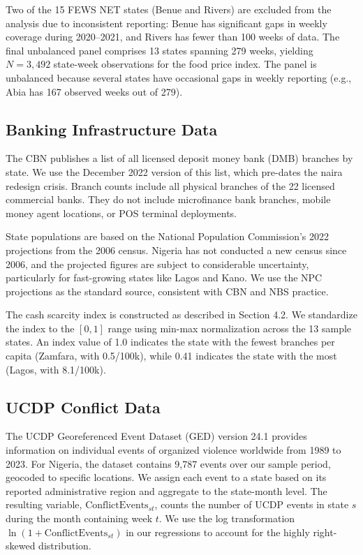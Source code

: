 \documentclass[12pt]{article}
\begin{document}
Two of the 15 FEWS NET states (Benue and Rivers) are excluded from the analysis due to inconsistent reporting: Benue has significant gaps in weekly coverage during 2020--2021, and Rivers has fewer than 100 weeks of data. The final unbalanced panel comprises 13 states spanning 279 weeks, yielding $N = 3{,}492$ state-week observations for the food price index. The panel is unbalanced because several states have occasional gaps in weekly reporting (e.g., Abia has 167 observed weeks out of 279).

\subsection{Banking Infrastructure Data}

The CBN publishes a list of all licensed deposit money bank (DMB) branches by state. We use the December 2022 version of this list, which pre-dates the naira redesign crisis. Branch counts include all physical branches of the 22 licensed commercial banks. They do not include microfinance bank branches, mobile money agent locations, or POS terminal deployments.

State populations are based on the National Population Commission's 2022 projections from the 2006 census. Nigeria has not conducted a new census since 2006, and the projected figures are subject to considerable uncertainty, particularly for fast-growing states like Lagos and Kano. We use the NPC projections as the standard source, consistent with CBN and NBS practice.

The cash scarcity index is constructed as described in Section 4.2. We standardize the index to the $[0, 1]$ range using min-max normalization across the 13 sample states. An index value of 1.0 indicates the state with the fewest branches per capita (Zamfara, with 0.5/100k), while 0.41 indicates the state with the most (Lagos, with 8.1/100k).

\subsection{UCDP Conflict Data}

The UCDP Georeferenced Event Dataset (GED) version 24.1 \citep{sundararaman2023ucdp} provides information on individual events of organized violence worldwide from 1989 to 2023. For Nigeria, the dataset contains 9,787 events over our sample period, geocoded to specific locations. We assign each event to a state based on its reported administrative region and aggregate to the state-month level. The resulting variable, $\text{ConflictEvents}_{st}$, counts the number of UCDP events in state $s$ during the month containing week $t$. We use the log transformation $\ln(1 + \text{ConflictEvents}_{st})$ in our regressions to account for the highly right-skewed distribution.
\end{document}
